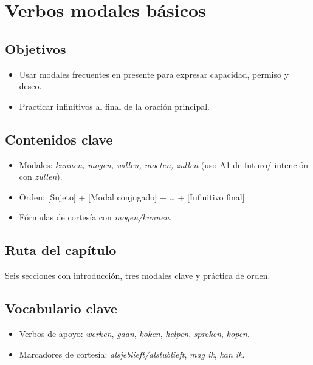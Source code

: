 \chapter{Verbos modales básicos}
\section{Objetivos}
\begin{itemize}[leftmargin=*]
	\item Usar modales frecuentes en presente para expresar capacidad, permiso y deseo.
	\item Practicar infinitivos al final de la oración principal.
\end{itemize}

\section{Contenidos clave}
\begin{itemize}[leftmargin=*]
	\item Modales: \textit{kunnen, mogen, willen, moeten, zullen} (uso A1 de futuro/ intención con \textit{zullen}).
	\item Orden: [Sujeto] + [Modal conjugado] + \ldots{} + [Infinitivo final].
	\item Fórmulas de cortesía con \textit{mogen/kunnen}.
\end{itemize}

\section{Ruta del capítulo}
Seis secciones con introducción, tres modales clave y práctica de orden.








\section{Vocabulario clave}
\begin{itemize}[leftmargin=*]
	\item Verbos de apoyo: \textit{werken}, \textit{gaan}, \textit{koken}, \textit{helpen}, \textit{spreken}, \textit{kopen}.
	\item Marcadores de cortesía: \textit{alsjeblieft/alstublieft}, \textit{mag ik}, \textit{kan ik}.
\end{itemize}

